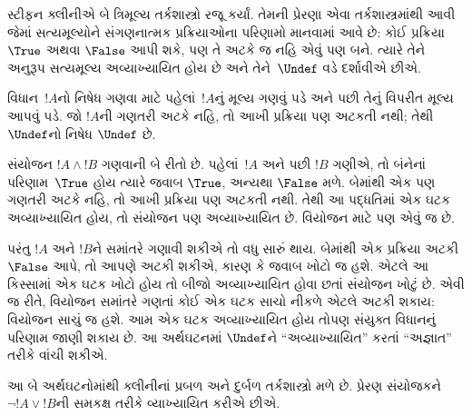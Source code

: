 \documentclass[../../../include/open-logic-section]{subfiles}
\begin{document}


સ્ટીફન ક્લીનીએ બે ત્રિમૂલ્ય તર્કશાસ્ત્રો રજૂ કર્યાં. તેમની પ્રેરણા
એવા તર્કશાસ્ત્રમાંથી આવી જેમાં સત્યમૂલ્યોને સંગણનાત્મક પ્રક્રિયાઓના
પરિણામો માનવામાં આવે છે: કોઈ પ્રક્રિયા $\True$ અથવા $\False$ આપી
શકે, પણ તે અટકે જ નહિ એવું પણ બને. ત્યારે તેને અનુરૂપ સત્યમૂલ્ય
અવ્યાખ્યાયિત હોય છે અને તેને~$\Undef$ વડે દર્શાવીએ છીએ.

વિધાન~$!A$નો નિષેધ ગણવા માટે પહેલાં~$!A$નું મૂલ્ય ગણવું પડે અને
પછી તેનું વિપરીત મૂલ્ય આપવું પડે. જો $!A$ની ગણતરી અટકે નહિ, તો
આખી પ્રક્રિયા પણ અટકતી નથી; તેથી $\Undef$નો નિષેધ $\Undef$ છે.

સંયોજન $!A \land !B$ ગણવાની બે રીતો છે. પહેલાં~$!A$ અને પછી
$!B$ ગણીએ, તો બંનેનાં પરિણામ~$\True$ હોય ત્યારે જવાબ $\True$,
અન્યથા $\False$ મળે. બેમાંથી એક પણ ગણતરી અટકે નહિ, તો આખી
પ્રક્રિયા પણ અટકતી નથી. તેથી આ પદ્ધતિમાં એક ઘટક અવ્યાખ્યાયિત
હોય, તો સંયોજન પણ અવ્યાખ્યાયિત છે. વિયોજન માટે પણ એવું જ છે.

પરંતુ $!A$ અને $!B$ને સમાંતરે ગણાવી શકીએ તો વધુ સારું થાય.
બેમાંથી એક પ્રક્રિયા અટકી $\False$ આપે, તો આપણે અટકી શકીએ,
કારણ કે જવાબ ખોટો જ હશે. એટલે આ કિસ્સામાં એક ઘટક ખોટો હોય
તો બીજો અવ્યાખ્યાયિત હોવા છતાં સંયોજન ખોટું છે. એવી જ રીતે,
વિયોજન સમાંતરે ગણતાં કોઈ એક ઘટક સાચો નીકળે એટલે અટકી શકાય:
વિયોજન સાચું જ હશે. આમ એક ઘટક અવ્યાખ્યાયિત હોય તોપણ સંયુક્ત
વિધાનનું પરિણામ જાણી શકાય છે. આ અર્થઘટનમાં $\Undef$ને
``અવ્યાખ્યાયિત'' કરતાં ``અજ્ઞાત'' તરીકે વાંચી શકીએ.

આ બે અર્થઘટનોમાંથી ક્લીનીનાં પ્રબળ અને દુર્બળ તર્કશાસ્ત્રો મળે છે.
પ્રેરણ સંયોજકને $\lnot !A \lor !B$ની સમકક્ષ તરીકે વ્યાખ્યાયિત કરીએ છીએ.
\end{document}
